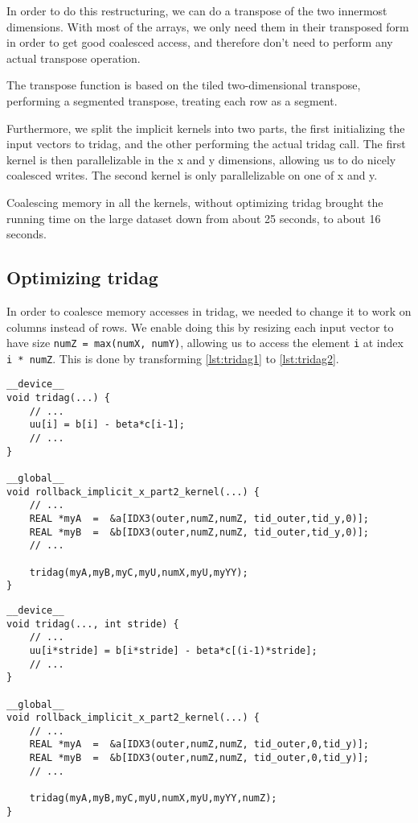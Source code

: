 \documentclass[a4paper]{article}
\begin{document}
In order to do this restructuring, we can do a transpose of the two innermost
dimensions. With most of the arrays, we only need them in their transposed
form in order to get good coalesced access, and therefore don't need to
perform any actual transpose operation.

The transpose function is based on the tiled two-dimensional transpose,
performing a segmented transpose, treating each row as a segment.

Furthermore, we split the implicit kernels into two parts, the first
initializing the input vectors to tridag, and the other performing the
actual tridag call. The first kernel is then parallelizable in the x and y
dimensions, allowing us to do nicely coalesced writes. The second kernel is
only parallelizable on one of x and y.

Coalescing memory in all the kernels, without optimizing tridag brought the
running time on the large dataset down from about 25 seconds, to about 16
seconds.

\subsection{Optimizing tridag}

In order to coalesce memory accesses in tridag, we needed to change it to work
on columns instead of rows. We enable doing this by resizing each input vector
to have size \texttt{numZ = max(numX, numY)}, allowing us to access the element
\texttt{i} at index \texttt{i * numZ}. This is done by transforming
\autoref{lst:tridag1} to \autoref{lst:tridag2}.

\begin{lstlisting}[caption={The call to \texttt{tridag} pre-coalescing},label={lst:tridag1}]
__device__
void tridag(...) {
    // ...
    uu[i] = b[i] - beta*c[i-1];
    // ...
}

__global__
void rollback_implicit_x_part2_kernel(...) {
    // ...
    REAL *myA  =  &a[IDX3(outer,numZ,numZ, tid_outer,tid_y,0)];
    REAL *myB  =  &b[IDX3(outer,numZ,numZ, tid_outer,tid_y,0)];
    // ...

    tridag(myA,myB,myC,myU,numX,myU,myYY);
}
\end{lstlisting}

\begin{lstlisting}[caption={The call to \texttt{tridag} post-coalescing},label={lst:tridag2}]
__device__
void tridag(..., int stride) {
    // ...
    uu[i*stride] = b[i*stride] - beta*c[(i-1)*stride];
    // ...
}

__global__
void rollback_implicit_x_part2_kernel(...) {
    // ...
    REAL *myA  =  &a[IDX3(outer,numZ,numZ, tid_outer,0,tid_y)];
    REAL *myB  =  &b[IDX3(outer,numZ,numZ, tid_outer,0,tid_y)];
    // ...

    tridag(myA,myB,myC,myU,numX,myU,myYY,numZ);
}
\end{lstlisting}
\end{document}
